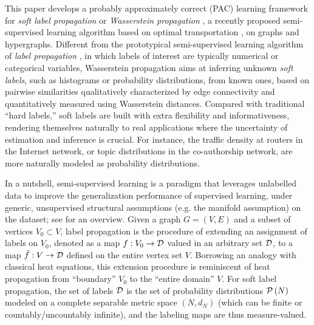 \documentclass[letterpaper]{article} %
\begin{document}
This paper develops a probably approximately correct (PAC) learning framework for \emph{soft label propagation} or \emph{Wasserstein propagation} \cite{Solomon:2014}, a recently proposed semi-supervised learning algorithm based on optimal transportation \cite{villani2003topics,villani2008optimal}, on graphs and hypergraphs. Different from the prototypical semi-supervised learning algorithm of \emph{label propagation} \cite{Belkin2004}, in which labels of interest are typically numerical or categorical variables, Wasserstein propagation aims at inferring unknown \emph{soft labels}, such as histograms or probability distributions, from known ones, based on pairwise similarities qualitatively characterized by edge connectivity and quantitatively measured using Wasserstein distances. Compared with traditional ``hard labels,'' soft labels are built with extra flexibility and informativeness, rendering themselves naturally to real applications where the uncertainty of estimation and inference is crucial. For instance, the traffic density at routers in the Internet network, or topic distributions in the co-authorship network, are more naturally modeled as probability distributions.

In a nutshell, semi-supervised learning is a paradigm that leverages unlabelled data to improve the generalization performance of supervised learning, under generic, unsupervised structural assumptions (e.g. the manifold assumption) on the dataset; see \cite{Seeger01learningwith,Zhu06SSL,CSZ2006} for an overview. Given a graph $G=\left( V,E \right)$ and a subset of vertices $V_0\subset V$, label propagation is the procedure of extending an assignment of labels on $V_0$, denoted as a map $f:V_0\rightarrow \D$ valued in an arbitrary set $\D$, to a map $\bar{f}:V\rightarrow\D$ defined on the entire vertex set $V$. Borrowing an analogy with classical heat equations, this extension procedure is reminiscent of heat propagation from ``boundary'' $V_0$ to the ``entire domain'' $V$. For soft label propagation, the set of labels $\D$ is the set of probability distributions $\P \left( N \right)$ modeled on a complete separable metric space $\left( N,d_N \right)$ (which can be finite or countably/uncountably infinite), and the labeling maps are thus measure-valued.
\end{document}
